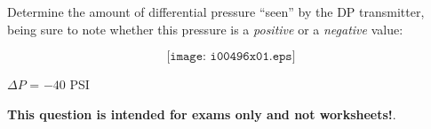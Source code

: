 

Determine the amount of differential pressure ``seen'' by the DP transmitter, being sure to note whether this pressure is a {\it positive} or a {\it negative} value:

$$\texttt{[image: i00496x01.eps]}$$







$\Delta P$ = $-40$ PSI







{\bf This question is intended for exams only and not worksheets!}.



